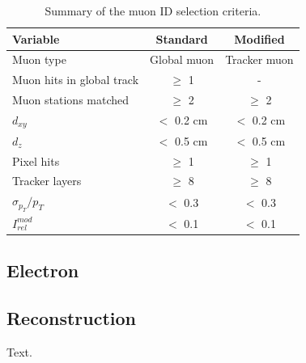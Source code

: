 \begin{table}[h]
  \begin{center}
    \begin{tabular}{|l|c|c|}
      \hline
      Variable & Standard & Modified \\ \hline
      Muon type & Global muon & Tracker muon \\
      Muon hits in global track & $\geq$ 1 & - \\
      Muon stations matched & $\geq$ 2 & $\geq$ 2 \\
      $d_{xy}$ & $<$ 0.2 cm & $<$ 0.2 cm\\
      $d_{z}$ & $<$ 0.5 cm & $<$ 0.5 cm\\
      Pixel hits & $\geq$ 1 & $\geq$ 1 \\
      Tracker layers & $\geq$ 8 & $\geq$ 8 \\
      $\sigma_{p_{T}}/p_{T}$ & $<$ 0.3 & $<$ 0.3 \\ \hline
      $I_{rel}^{mod}$  & $<$ 0.1 & $<$ 0.1 \\
      \hline
    \end{tabular}
    \caption{\label{tab:MuonIDtable} Summary of the muon ID selection criteria.}
  \end{center}
\end{table}


\subsection{Electron}
\subsection*{Reconstruction}
Text.
